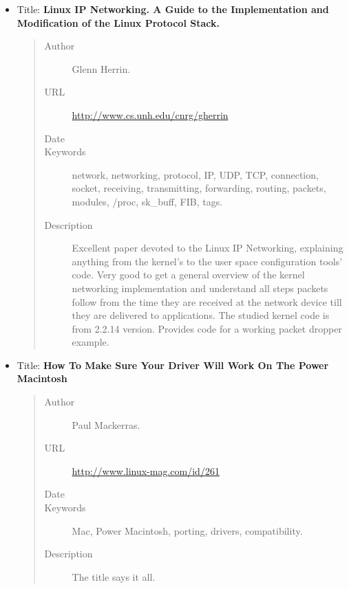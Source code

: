 \documentclass[a4paper,8pt,english]{sphinxmanual}
\begin{document}
\begin{itemize}
\item {} 
Title: \textbf{Linux IP Networking. A Guide to the Implementation and Modification of the Linux Protocol Stack.}
\begin{quote}\begin{description}
\item[{Author}] \leavevmode
Glenn Herrin.

\item[{URL}] \leavevmode
\href{http://www.cs.unh.edu/cnrg/gherrin}{http://www.cs.unh.edu/cnrg/gherrin}

\item[{Date}] 

\item[{Keywords}] \leavevmode
network, networking, protocol, IP, UDP, TCP, connection,
socket, receiving, transmitting, forwarding, routing, packets,
modules, /proc, sk\_buff, FIB, tags.

\item[{Description}] \leavevmode
Excellent paper devoted to the Linux IP Networking,
explaining anything from the kernel's to the user space
configuration tools' code. Very good to get a general overview of
the kernel networking implementation and understand all steps
packets follow from the time they are received at the network
device till they are delivered to applications. The studied kernel
code is from 2.2.14 version. Provides code for a working packet
dropper example.

\end{description}\end{quote}

\item {} 
Title: \textbf{How To Make Sure Your Driver Will Work On The Power Macintosh}
\begin{quote}\begin{description}
\item[{Author}] \leavevmode
Paul Mackerras.

\item[{URL}] \leavevmode
\href{http://www.linux-mag.com/id/261}{http://www.linux-mag.com/id/261}

\item[{Date}] 

\item[{Keywords}] \leavevmode
Mac, Power Macintosh, porting, drivers, compatibility.

\item[{Description}] \leavevmode
The title says it all.


\end{description}
\end{quote}
\end{itemize}
\end{document}
